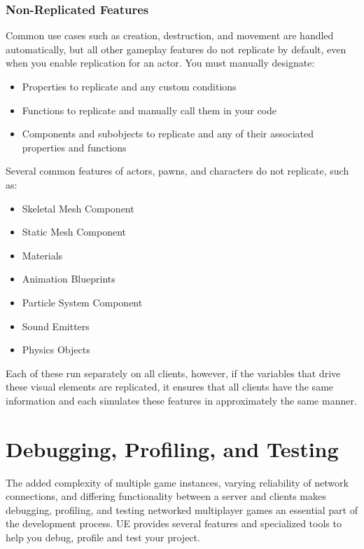 \documentclass[
  letterpaper,
  DIV=11,
  numbers=noendperiod]{scrartcl}
\providecommand{\tightlist}{%
  \setlength{\itemsep}{0pt}\setlength{\parskip}{0pt}}
\begin{document}
\subsubsection{Non-Replicated Features}\label{non-replicated-features}

Common use cases such as creation, destruction, and movement are handled
automatically, but all other gameplay features do not replicate by
default, even when you enable replication for an actor. You must
manually designate:

\begin{itemize}
\tightlist
\item
  Properties to replicate and any custom conditions
\item
  Functions to replicate and manually call them in your code
\item
  Components and subobjects to replicate and any of their associated
  properties and functions
\end{itemize}

Several common features of actors, pawns, and characters do not
replicate, such as:

\begin{itemize}
\tightlist
\item
  Skeletal Mesh Component
\item
  Static Mesh Component
\item
  Materials
\item
  Animation Blueprints
\item
  Particle System Component
\item
  Sound Emitters
\item
  Physics Objects
\end{itemize}

Each of these run separately on all clients, however, if the variables
that drive these visual elements are replicated, it ensures that all
clients have the same information and each simulates these features in
approximately the same manner.

\section{Debugging, Profiling, and
Testing}\label{debugging-profiling-and-testing}

The added complexity of multiple game instances, varying reliability of
network connections, and differing functionality between a server and
clients makes debugging, profiling, and testing networked multiplayer
games an essential part of the development process. UE provides several
features and specialized tools to help you debug, profile and test your
project.
\end{document}
